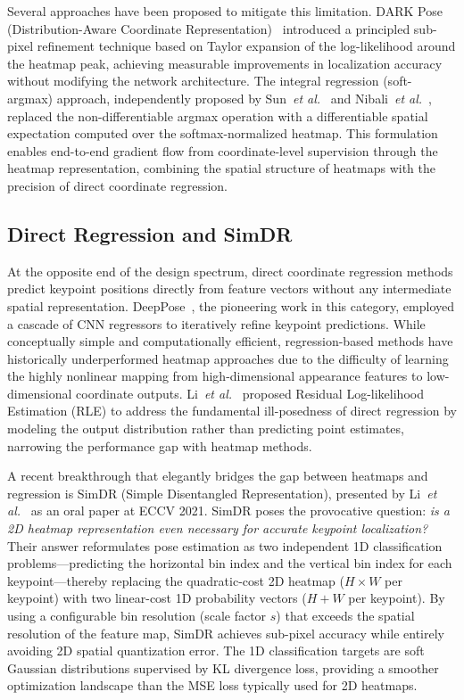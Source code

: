 Several approaches have been proposed to mitigate this limitation. DARK Pose (Distribution-Aware Coordinate Representation)~\cite{zhang2020distribution} introduced a principled sub-pixel refinement technique based on Taylor expansion of the log-likelihood around the heatmap peak, achieving measurable improvements in localization accuracy without modifying the network architecture. The integral regression (soft-argmax) approach, independently proposed by Sun~\emph{et al.}~\cite{sun2018integral} and Nibali~\emph{et al.}~\cite{nibali2018numerical}, replaced the non-differentiable argmax operation with a differentiable spatial expectation computed over the softmax-normalized heatmap. This formulation enables end-to-end gradient flow from coordinate-level supervision through the heatmap representation, combining the spatial structure of heatmaps with the precision of direct coordinate regression.

\subsection*{Direct Regression and SimDR}

At the opposite end of the design spectrum, direct coordinate regression methods predict keypoint positions directly from feature vectors without any intermediate spatial representation. DeepPose~\cite{toshev2014deeppose}, the pioneering work in this category, employed a cascade of CNN regressors to iteratively refine keypoint predictions. While conceptually simple and computationally efficient, regression-based methods have historically underperformed heatmap approaches due to the difficulty of learning the highly nonlinear mapping from high-dimensional appearance features to low-dimensional coordinate outputs. Li~\emph{et al.}~\cite{li2021human} proposed Residual Log-likelihood Estimation (RLE) to address the fundamental ill-posedness of direct regression by modeling the output distribution rather than predicting point estimates, narrowing the performance gap with heatmap methods.

A recent breakthrough that elegantly bridges the gap between heatmaps and regression is SimDR (Simple Disentangled Representation), presented by Li~\emph{et al.}~\cite{li20212d} as an oral paper at ECCV 2021. SimDR poses the provocative question: \emph{is a 2D heatmap representation even necessary for accurate keypoint localization?} Their answer reformulates pose estimation as two independent 1D classification problems---predicting the horizontal bin index and the vertical bin index for each keypoint---thereby replacing the quadratic-cost 2D heatmap ($H \times W$ per keypoint) with two linear-cost 1D probability vectors ($H + W$ per keypoint). By using a configurable bin resolution (scale factor $s$) that exceeds the spatial resolution of the feature map, SimDR achieves sub-pixel accuracy while entirely avoiding 2D spatial quantization error. The 1D classification targets are soft Gaussian distributions supervised by KL divergence loss, providing a smoother optimization landscape than the MSE loss typically used for 2D heatmaps.

